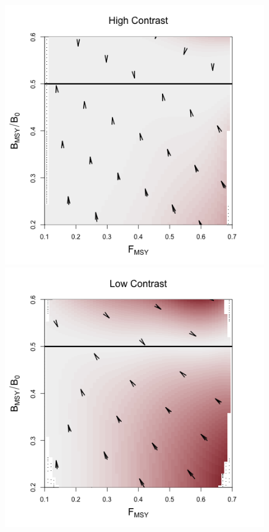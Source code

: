 \begin{figure}[h!]
\begin{minipage}[h!]{0.44\textwidth}
\includegraphics[width=\textwidth]{../ptNew/directionalBiasSubPTExpT45MinCon.png}
\end{minipage}
\begin{minipage}[h!]{0.44\textwidth}
\includegraphics[width=\textwidth]{../edits/directionalBiasSubPTTitleFlatT30nF1.png}%

\end{minipage}
\end{figure}
